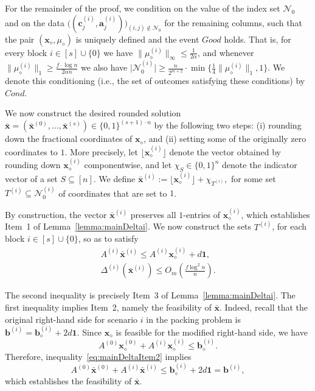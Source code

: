 \documentclass{article}
\newcommand{\cN}{\mathcal{N}}
\newcommand{\av}[0]{\mathbf{a}}
\newcommand{\cv}[0]{\mathbf{c}}
\newcommand{\xv}[0]{\mathbf{x}}
\newcommand{\bv}[0]{\mathbf{b}}
\newcommand{\ones}{{\bm{1}}}
\newcommand{\normm}[1]{\big\lVert#1\big\rVert}
\newcommand{\colij}{\av^{(i)}_j}
\begin{document}
For the remainder of the proof, we condition on the value of the index set
$\cN_0$ and on the data $\big((\cv^{(i)}_j, \colij)\big)_{(i,j)\notin \cN_0}$ for
the remaining columns, such that the pair $(\xv_{\diamond}, \mu_{\diamond})$ is
uniquely defined and the event $Good$ holds.
That is, for every block $i \in [s] \cup \{0\}$ we have
$\big\|\mu_{\diamond}^{(i)}\big\|_{\infty} \leq \frac{1}{2\alpha}$, and whenever
$\big\|\mu_{\diamond}^{(i)}\big\|_1 \ge \frac{f \cdot \log n}{2 \alpha n}$ we also
have
$\big|\mathcal{N}_0^{(i)}\big|
\geq
\frac{n}{2^{m+2}} \cdot
\min\Big\{ \tfrac{1}{4} \normm{\mu^{(i)}_\diamond}_1, 1 \Big\}.$
We denote this conditioning (i.e., the set of outcomes satisfying these
conditions) by $Cond$.

We now construct the desired rounded solution
$\bar{\xv} = (\bar{\xv}^{(0)}, \ldots, \bar{\xv}^{(s)}) \in \{0,1\}^{(s+1)\cdot n}$
by the following two steps:
(i) rounding down the fractional coordinates of $\xv_{\diamond}$, and
(ii) setting some of the originally zero coordinates to $1$.
More precisely, let $\lfloor \xv^{(i)}_{\diamond} \rfloor$ denote the vector
obtained by rounding down $\xv^{(i)}_{\diamond}$ componentwise, and let
$\chi_S \in \{0,1\}^n$ denote the indicator vector of a set $S \subseteq [n]$.
We define $
\bar{\xv}^{(i)} := \lfloor \xv^{(i)}_{\diamond} \rfloor + \chi_{T^{(i)}},$
for some set $T^{(i)} \subseteq \cN_0^{(i)}$ of coordinates that are set to $1$.

By construction, the vector $\bar{\xv}^{(i)}$ preserves all $1$-entries of
$\xv^{(i)}_{\diamond}$, which establishes Item~1 of
Lemma~\ref{lemma:mainDeltai}.
We now construct the sets $T^{(i)}$, for each block
$i \in [s] \cup \{0\}$, so as to satisfy
%
\begin{gather}
    A^{(i)} \bar{\xv}^{(i)}
    \le A^{(i)} \xv^{(i)}_{\diamond} + d \ones,
    \label{eq:mainDeltaItem2} \\[2pt]
    \Delta^{(i)}(\bar{\xv}^{(i)})
    \le O_m\!\left(\frac{f \log^2 n}{n}\right).
    \label{eq:mainDeltaItem3}
\end{gather}

The second inequality is precisely Item~3 of
Lemma~\ref{lemma:mainDeltai}.
The first inequality implies Item~2, namely the feasibility of $\bar{\xv}$.
Indeed, recall that the original right-hand side for scenario $i$ in the packing
problem is
$\bv^{(i)} = \bv^{(i)}_{\diamond} + 2d\ones$.
Since $\xv_{\diamond}$ is feasible for the modified right-hand side, we have
\[
A^{(0)} \xv_{\diamond}^{(0)} + A^{(i)} \xv_{\diamond}^{(i)}
\le \bv^{(i)}_{\diamond}.
\]
Therefore, inequality~\eqref{eq:mainDeltaItem2} implies
\[
A^{(0)} \bar{\xv}^{(0)} + A^{(i)} \bar{\xv}^{(i)}
\le \bv^{(i)}_{\diamond} + 2d\ones
= \bv^{(i)},
\]
which establishes the feasibility of $\bar{\xv}$.
\end{document}
